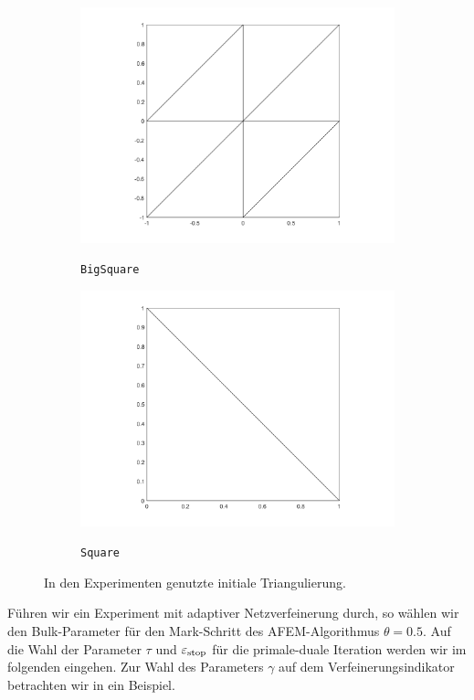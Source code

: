 \begin{figure}[!ht]
  \centering
  \begin{subfigure}[b]{.48\linewidth}
    \caption{\texttt{BigSquare}}
    \includegraphics[trim = 90 30 90 20, clip, width=\linewidth]
      {pictures/chapExperiments/secGeneralInfo/bigSquareTriang.png}
    \label{fig:triangBigSquare}
  \end{subfigure}
  \quad
  \begin{subfigure}[b]{.48\linewidth}
    \caption{\texttt{Square}}
    \includegraphics[trim = 90 30 90 20, clip, width=\linewidth]
      {pictures/chapExperiments/secGeneralInfo/squareTriang.png}
    \label{fig:triangSquare}
  \end{subfigure}
  \caption{In den Experimenten genutzte initiale Triangulierung.}
  \label{fig:initialTriangulations}
\end{figure}
Führen wir ein Experiment mit adaptiver Netzverfeinerung durch, so wählen wir
den Bulk-Parameter für den Mark-Schritt des AFEM-Algorithmus $\theta=0.5$.
Auf die Wahl der Parameter $\tau$ und $\varepsilon_{\textup{stop}}$ für die primale-duale
Iteration werden wir im folgenden  eingehen.
Zur Wahl des Parameters $\gamma$ auf dem Verfeinerungsindikator betrachten
wir in  ein Beispiel.


